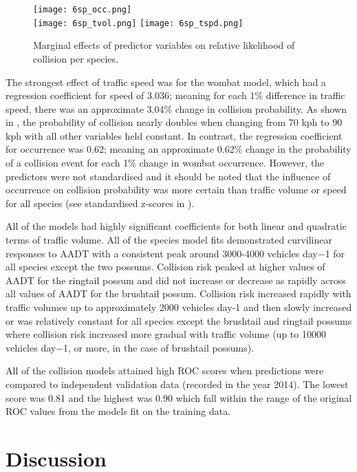 \begin{figure*}[htp]
  \centering
  \texttt{[image: 6sp\_occ.png]}\\
  \texttt{[image: 6sp\_tvol.png]}
  \texttt{[image: 6sp\_tspd.png]}
  \caption[]{Marginal effects of predictor variables on relative likelihood of collision per species.}
  \label{6sp_effects}
\end{figure*}

The strongest effect of traffic speed was for the wombat model, which had a regression coefficient for speed of 3.036; meaning for each 1\% difference in traffic speed, there was an approximate 3.04\% change in collision probability. As shown in , the probability of collision nearly doubles when changing from 70 kph to 90 kph with all other variables held constant. In contrast, the regression coefficient for occurrence was 0.62; meaning an approximate 0.62\% change in the probability of a collision event for each 1\% change in wombat occurrence. However, the predictors were not standardised and it should be noted that the influence of occurrence on collision probability was more certain than traffic volume or speed for all species (see standardised z-scores in ).

All of the models had highly significant coefficients for both linear and quadratic terms of traffic volume.  All of the species model fits demonstrated curvilinear responses to AADT with a consistent peak around 3000-4000 vehicles day−1 for all species except the two possums.  Collision risk peaked at higher values of AADT for the ringtail possum and did not increase or decrease as rapidly across all values of AADT for the brushtail possum.  Collision risk increased rapidly with traffic volumes up to approximately 2000 vehicles day-1 and then slowly increased or was relatively constant for all species except the brushtail and ringtail possums where collision risk increased more gradual with traffic volume (up to 10000 vehicles day−1, or more, in the case of brushtail possums).

All of the collision models attained high ROC scores when predictions were compared to independent validation data (recorded in the year 2014).  The lowest score was 0.81 and the highest was 0.90 which fall within the range of the original ROC values from the models fit on the training data.

\section{Discussion}

